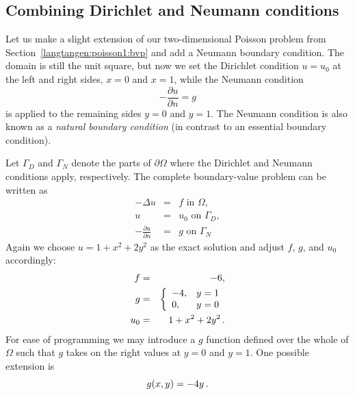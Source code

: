 \subsection{Combining Dirichlet and Neumann conditions}
\label{langtangen:poisson1:DN}

Let us make a slight extension of our two-dimensional Poisson problem
from Section~\ref{langtangen:poisson1:bvp} and add a Neumann boundary
condition. The domain is still the unit square, but now we set the
Dirichlet condition $u=u_0$ at the left and right sides, $x=0$ and
$x=1$, while the Neumann condition
%
\begin{equation*}
 - \frac{\partial u}{\partial n} = g
\end{equation*}
%
is applied to the remaining
sides $y=0$ and $y=1$.
The Neumann condition is also known as a \emph{natural boundary condition}
(in contrast to an essential boundary condition).

Let $\Gamma_D$ and $\Gamma_N$ denote the parts of $\partial\Omega$
where the Dirichlet and Neumann conditions apply, respectively.  The
complete boundary-value problem can be written as
\begin{eqnarray}
    - \Delta u &=& f \mbox{ in } \Omega,  \\ %
    u &=& u_0 \mbox{ on } \Gamma_D,       \\ %
    - \frac{\partial u}{\partial n} &=& g \mbox{ on } \Gamma_N  %
\end{eqnarray}
Again we choose $u=1+x^2 + 2y^2$ as the exact solution and adjust $f$, $g$, and
$u_0$ accordingly:
\begin{eqnarray}
f &=& -6,\\
g &=& \left\lbrace\begin{array}{ll}
-4, & y=1\\
0,  & y=0
\end{array}\right.\\
u_0 &=& 1 + x^2 + 2y^2\thinspace .
\end{eqnarray}
For ease of programming we may introduce a $g$ function defined over the whole
of $\Omega$ such that $g$ takes on the right values at $y=0$ and
$y=1$. One possible extension is
\[ g(x,y) = -4y\thinspace .\]

